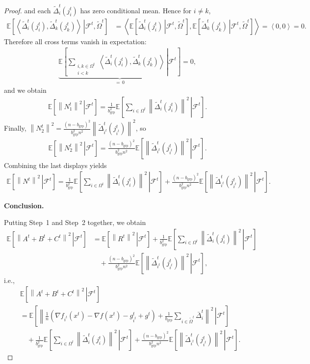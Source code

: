 \documentclass{article}
\newcommand{\inner}[2]{\left\langle #1, #2 \right\rangle}
\newcommand{\sqn}[1]{\left\| #1 \right\|^2}
\newcommand{\Expb}[2]{\mathbb{E}\!\left[\left. #1\,\right|#2 \right]}
\newcommand{\Expc}[1]{\Expb{#1}{\mathcal{F}^t}}
\theoremstyle{plain}
\begin{document}
\begin{proof}
and each $\widetilde{\Delta}_i^t(j_i^t)$ has zero conditional mean. Hence for $i\neq k$,
\begin{align*}
\Expb{\inner{\widetilde{\Delta}_i^t(j_i^t)}{\widetilde{\Delta}_k^t(j_k^t)}}{\mathcal{F}^t,\tilde{\Omega}^t}
&=\inner{\Expb{\widetilde{\Delta}_i^t(j_i^t)}{\mathcal{F}^t,\tilde{\Omega}^t}}
{\Expb{\widetilde{\Delta}_k^t(j_k^t)}{\mathcal{F}^t,\tilde{\Omega}^t}}
=\inner{0}{0}=0.
\end{align*}
Therefore all cross terms vanish in expectation:
\begin{align*}
\underbrace{\Expc{\sum_{\substack{i,k\in\Omega^t\\ i<k}}
\inner{\widetilde{\Delta}_i^t(j_i^t)}{\widetilde{\Delta}_k^t(j_k^t)}}}_{=\,0}=0,
\end{align*}
and we obtain
\begin{align*}
\Expc{\sqn{N_1^t}}
=\frac{1}{b_{\mathrm{grp}}^2}\Expc{\sum_{i\in\Omega^t}\sqn{\widetilde{\Delta}_i^t(j_i^t)}}.
\end{align*}
Finally, $\sqn{N_2^t}=\frac{(n-b_{\mathrm{grp}})^2}{b_{\mathrm{grp}}^2n^2}\sqn{\widetilde{\Delta}_{i^t}^t(j_{i^t}^t)}$, so
\begin{align*}
\Expc{\sqn{N_2^t}}
=\frac{(n-b_{\mathrm{grp}})^2}{b_{\mathrm{grp}}^2n^2}\Expc{\sqn{\widetilde{\Delta}_{i^t}^t(j_{i^t}^t)}}.
\end{align*}
Combining the last displays yields
\begin{align*}
\Expc{\sqn{N^t}}
=\frac{1}{b_{\mathrm{grp}}^2}\Expc{\sum_{i\in\Omega^t}\sqn{\widetilde{\Delta}_i^t(j_i^t)}}
+\frac{(n-b_{\mathrm{grp}})^2}{b_{\mathrm{grp}}^2n^2}\Expc{\sqn{\widetilde{\Delta}_{i^t}^t(j_{i^t}^t)}}.
\end{align*}

\textbf{Conclusion.}

Putting Step~1 and Step~2 together, we obtain
\begin{align*}
\Expc{\sqn{A^t+B^t+C^t}}
&=\Expc{\sqn{R^t}}
+\frac{1}{b_{\mathrm{grp}}^2}\Expc{\sum_{i\in\Omega^t}\sqn{\widetilde{\Delta}_i^t(j_i^t)}}\\
&\quad+\frac{(n-b_{\mathrm{grp}})^2}{b_{\mathrm{grp}}^2n^2}\Expc{\sqn{\widetilde{\Delta}_{i^t}^t(j_{i^t}^t)}},
\end{align*}
i.e.,
\begin{align*}
&\Expc{\sqn{A^t+B^t+C^t}} \\
&=\Expc{\left\|\frac{1}{n}\left(\nabla f_{i^t}(x^{t})-\nabla f(x^{t})-g_{i^t}^t+g^t\right)
+\frac{1}{b_{\mathrm{grp}}}\sum_{i\in\tilde{\Omega}^t}\bar{\Delta}_i^t\right\|^2}\\
&\quad+\frac{1}{b_{\mathrm{grp}}^2}\Expc{\sum_{i\in\Omega^t}\sqn{\widetilde{\Delta}_i^t(j_i^t)}}
+\frac{(n-b_{\mathrm{grp}})^2}{b_{\mathrm{grp}}^2n^2}\Expc{\sqn{\widetilde{\Delta}_{i^t}^t(j_{i^t}^t)}}.
\end{align*}


\end{proof}
\end{document}
